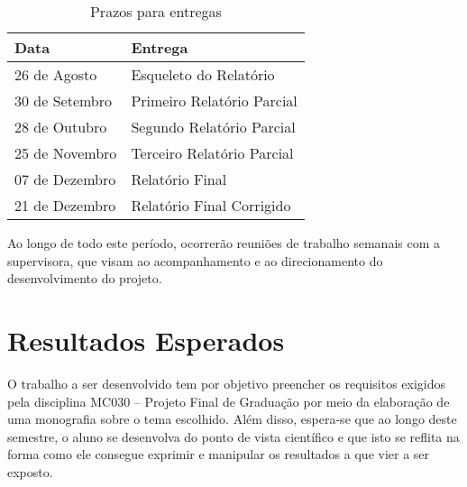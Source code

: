 \begin{table}[h!]
\centering
\caption{Prazos para entregas}
\label{tab:prazo}
\begin{tabular}{|l|l|}
\hline
Data           & Entrega                    \\\hline\hline
26 de Agosto   & Esqueleto do Relatório     \\
30 de Setembro & Primeiro Relatório Parcial \\
28 de Outubro  & Segundo Relatório Parcial  \\
25 de Novembro & Terceiro Relatório Parcial \\
07 de Dezembro & Relatório Final            \\
21 de Dezembro & Relatório Final Corrigido  \\\hline
\end{tabular}
\end{table}

Ao longo de todo este período, ocorrerão reuniões de trabalho semanais com a supervisora, que visam ao acompanhamento e ao direcionamento do desenvolvimento do projeto.


\section*{Resultados Esperados}

O trabalho a ser desenvolvido tem por objetivo preencher os requisitos
exigidos pela disciplina MC030 -- Projeto Final de Graduação por meio
da elaboração de uma monografia sobre o tema escolhido. Além disso,
espera-se que ao longo deste semestre, o aluno se desenvolva do ponto
de vista científico e que isto se reflita na forma como ele consegue
exprimir e manipular os resultados a que vier a ser exposto.

